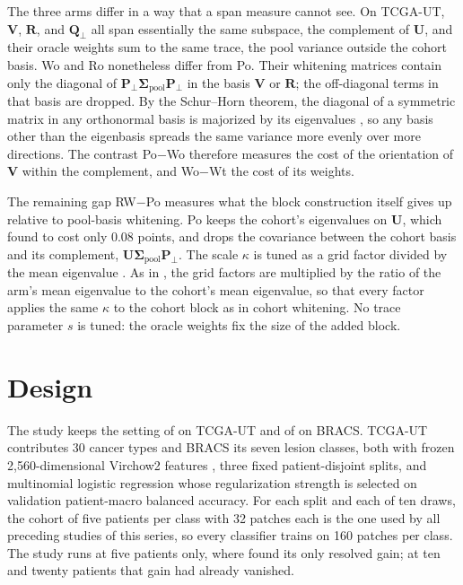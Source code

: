 \documentclass[11pt]{article}
\begin{document}
The three arms differ in a way that a span measure cannot see. On TCGA-UT, $\mathbf V$, $\mathbf R$, and $\mathbf Q_\perp$ all span essentially the same subspace, the complement of $\mathbf U$, and their oracle weights sum to the same trace, the pool variance outside the cohort basis. Wo and Ro nonetheless differ from Po. Their whitening matrices contain only the diagonal of $\mathbf P_\perp\boldsymbol\Sigma_{\text{pool}}\mathbf P_\perp$ in the basis $\mathbf V$ or $\mathbf R$; the off-diagonal terms in that basis are dropped. By the Schur--Horn theorem, the diagonal of a symmetric matrix in any orthonormal basis is majorized by its eigenvalues \citep{horn1954doubly}, so any basis other than the eigenbasis spreads the same variance more evenly over more directions. The contrast Po$-$Wo therefore measures the cost of the orientation of $\mathbf V$ within the complement, and Wo$-$Wt the cost of its weights.

The remaining gap RW$-$Po measures what the block construction itself gives up relative to pool-basis whitening. Po keeps the cohort's eigenvalues on $\mathbf U$, which \citet{queisler2026spectrumRegularization} found to cost only 0.08 points, and drops the covariance between the cohort basis and its complement, $\mathbf U\boldsymbol\Sigma_{\text{pool}}\mathbf P_\perp$. The scale $\kappa$ is tuned as a grid factor divided by the mean eigenvalue \citep{queisler2026patientDirections}. As in \citet{queisler2026withinPatientSpan}, the grid factors are multiplied by the ratio of the arm's mean eigenvalue to the cohort's mean eigenvalue, so that every factor applies the same $\kappa$ to the cohort block as in cohort whitening. No trace parameter $s$ is tuned: the oracle weights fix the size of the added block.

\section{Design}
\label{sec:design}
The study keeps the setting of \citet{queisler2026centreError} on TCGA-UT and of \citet{queisler2026bracsMechanism} on BRACS. TCGA-UT contributes 30 cancer types and BRACS its seven lesion classes, both with frozen 2,560-dimensional Virchow2 features \citep{zimmermann2024virchow2}, three fixed patient-disjoint splits, and multinomial logistic regression whose regularization strength is selected on validation patient-macro balanced accuracy. For each split and each of ten draws, the cohort of five patients per class with 32 patches each is the one used by all preceding studies of this series, so every classifier trains on 160 patches per class. The study runs at five patients only, where \citet{queisler2026withinPatientSpan} found its only resolved gain; at ten and twenty patients that gain had already vanished.
\end{document}
